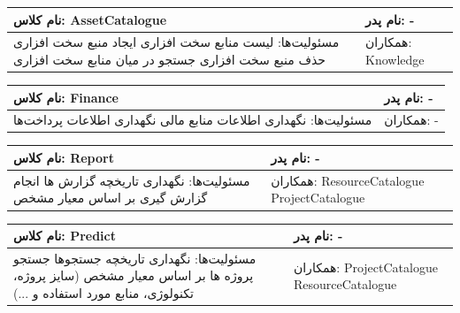 \documentclass{article}
\begin{document}
\begin{tabular}{|p{6cm}|p{6cm}|}
\hline
نام کلاس: AssetCatalogue
&
نام پدر: - 
\\
\hline
مسئولیت‌ها:
\newline
لیست منابع سخت افزاری
\newline
ایجاد منبع سخت افزاری
\newline
حذف منبع سخت افزاری
\newline
جستجو در میان منابع سخت افزاری
&
همکاران:
\newline
Knowledge
\\
\hline
\end{tabular}
\vspace{1cm}

\begin{tabular}{|p{6cm}|p{6cm}|}
\hline
نام کلاس: Finance
&
نام پدر: -
\\
\hline
مسئولیت‌ها:
\newline
نگهداری اطلاعات منابع مالی
\newline
نگهداری اطلاعات پرداخت‌ها
&
همکاران: -
\\
\hline
\end{tabular}
\vspace{1cm}

\begin{tabular}{|p{6cm}|p{6cm}|}
\hline
نام کلاس: Report
&
نام پدر: -
\\
\hline
مسئولیت‌ها:
\newline
نگهداری تاریخچه گزارش ها
\newline
انجام گزارش گیری بر اساس معیار مشخص

&
همکاران:
\newline
ResourceCatalogue
\newline
ProjectCatalogue
\\
\hline
\end{tabular}

\vspace{1cm}

\begin{tabular}{|p{6cm}|p{6cm}|}
\hline
نام کلاس: Predict
&
نام پدر: -
\\
\hline
مسئولیت‌ها:
\newline
نگهداری تاریخچه جستجوها
\newline
جستجو پروژه ها بر اساس معیار مشخص (سایز پروژه، تکنولوژی، منابع مورد استفاده و ...)
&
همکاران:
\newline
ProjectCatalogue
\newline
ResourceCatalogue
\\
\hline
\end{tabular}
\end{document}
